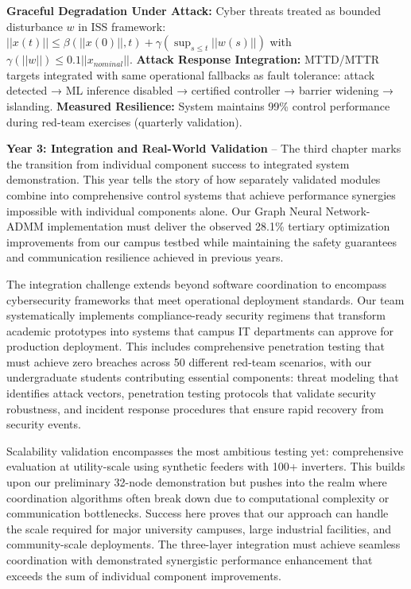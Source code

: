 \documentclass[12pt]{article}
\begin{document}
\textbf{Graceful Degradation Under Attack:} Cyber threats treated as bounded disturbance $w$ in ISS framework: $||x(t)|| \leq \beta(||x(0)||, t) + \gamma(\sup_{s \leq t} ||w(s)||)$ with $\gamma(||w||) \leq 0.1||x_{nominal}||$. \textbf{Attack Response Integration:} MTTD/MTTR targets integrated with same operational fallbacks as fault tolerance: attack detected → ML inference disabled → certified controller → barrier widening → islanding. \textbf{Measured Resilience:} System maintains 99\% control performance during red-team exercises (quarterly validation).

\textbf{Year 3: Integration and Real-World Validation} – The third chapter marks the transition from individual component success to integrated system demonstration. This year tells the story of how separately validated modules combine into comprehensive control systems that achieve performance synergies impossible with individual components alone. Our Graph Neural Network-ADMM implementation must deliver the observed 28.1\% tertiary optimization improvements from our campus testbed while maintaining the safety guarantees and communication resilience achieved in previous years.

The integration challenge extends beyond software coordination to encompass cybersecurity frameworks that meet operational deployment standards. Our team systematically implements compliance-ready security regimens that transform academic prototypes into systems that campus IT departments can approve for production deployment. This includes comprehensive penetration testing that must achieve zero breaches across 50 different red-team scenarios, with our undergraduate students contributing essential components: threat modeling that identifies attack vectors, penetration testing protocols that validate security robustness, and incident response procedures that ensure rapid recovery from security events.

Scalability validation encompasses the most ambitious testing yet: comprehensive evaluation at utility-scale using synthetic feeders with 100+ inverters. This builds upon our preliminary 32-node demonstration but pushes into the realm where coordination algorithms often break down due to computational complexity or communication bottlenecks. Success here proves that our approach can handle the scale required for major university campuses, large industrial facilities, and community-scale deployments. The three-layer integration must achieve seamless coordination with demonstrated synergistic performance enhancement that exceeds the sum of individual component improvements.
\end{document}
